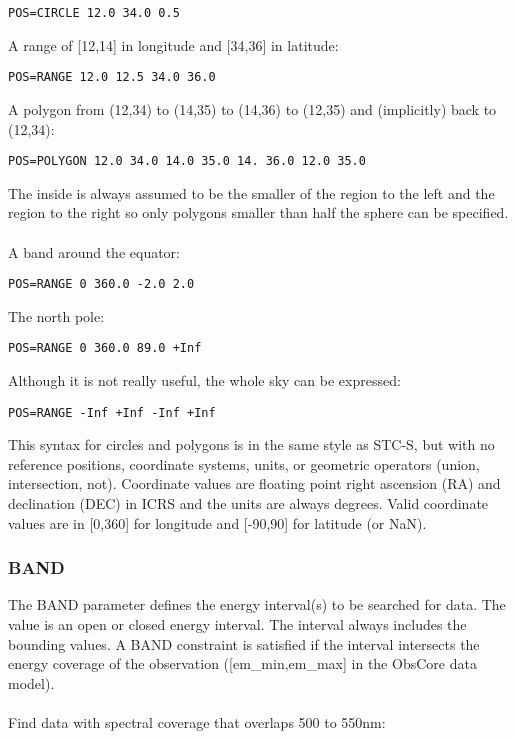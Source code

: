\documentclass[11pt,a4paper]{ivoa}
\begin{document}
\begin{lstlisting}
POS=CIRCLE 12.0 34.0 0.5
\end{lstlisting}
A range of [12,14] in longitude and [34,36] in latitude: 

\begin{lstlisting}
POS=RANGE 12.0 12.5 34.0 36.0 
\end{lstlisting}
A polygon from (12,34) to (14,35) to (14,36) to (12,35) and (implicitly) back to (12,34): 

\begin{lstlisting}
POS=POLYGON 12.0 34.0 14.0 35.0 14. 36.0 12.0 35.0
\end{lstlisting}

The inside is always assumed to be the smaller of the region to the left and the region to the right so only polygons smaller than half the sphere can be specified. \\ \\
A band around the equator: 

\begin{lstlisting}
POS=RANGE 0 360.0 -2.0 2.0 
\end{lstlisting}
The north pole: 

\begin{lstlisting}
POS=RANGE 0 360.0 89.0 +Inf 
\end{lstlisting}
Although it is not really useful, the whole sky can be expressed:



\begin{lstlisting}
POS=RANGE -Inf +Inf -Inf +Inf
\end{lstlisting}


This syntax for circles and polygons is in the same style as STC-S, but with no reference positions, coordinate systems, units, or geometric operators (union, intersection, not). Coordinate values are floating point right ascension (RA) and declination (DEC) in ICRS and the units are always degrees. Valid coordinate values are in [0,360] for longitude and [-90,90] for latitude (or NaN).

\subsubsection{BAND}
\label{sec:BAND}

The BAND parameter defines the energy interval(s) to be searched for data. The value is an open or closed energy interval. The interval always includes the bounding values. A BAND constraint is satisfied if the interval intersects the energy coverage of the observation ([em\_min,em\_max] in the ObsCore data model). \\ \\
Find data with spectral coverage that overlaps 500 to 550nm:
\end{document}
